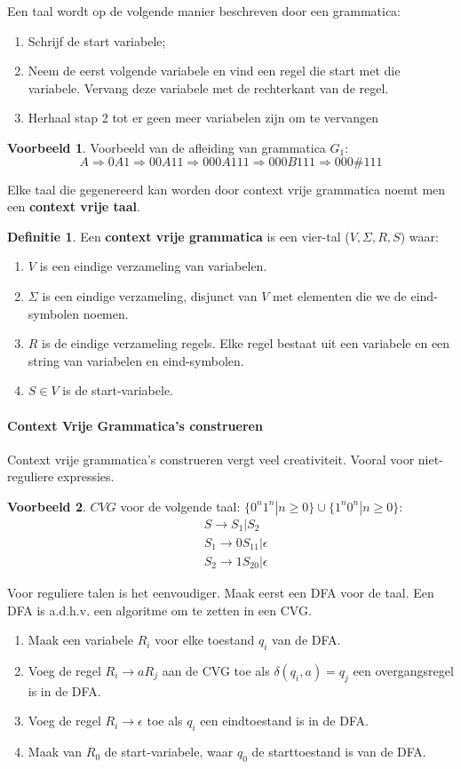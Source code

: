 \documentclass[12pt,a4paper]{article}
\theoremstyle{definition}
\newtheorem{defi}{Definitie}[section]
\newtheorem{vb}{Voorbeeld}[section]
\begin{document}
Een taal wordt op de volgende manier beschreven door een grammatica:
\begin{enumerate}
\item Schrijf de start variabele;
\item Neem de eerst volgende variabele en vind een regel die start met die variabele. Vervang deze variabele met de rechterkant van de regel.
\item Herhaal stap 2 tot er geen meer variabelen zijn om te vervangen
\end{enumerate}
\begin{vb}
Voorbeeld van de afleiding van grammatica $G_1$:
$$A\Rightarrow 0A1 \Rightarrow 00A11 \Rightarrow 000A111 \Rightarrow 000B111 \Rightarrow 000\#111$$
\end{vb}
Elke taal die gegenereerd kan worden door context vrije grammatica noemt men een \textbf{context vrije taal}.
\begin{defi}
Een \textbf{context vrije grammatica} is een vier-tal ($V,\Sigma,R,S$) waar:
\begin{enumerate}
\item $V$ is een eindige verzameling van variabelen.
\item $\Sigma$ is een eindige verzameling, disjunct van $V$ met elementen die we de eind-symbolen noemen.
\item $R$ is de eindige verzameling regels. Elke regel bestaat uit een variabele en een string van variabelen en eind-symbolen.
\item $S\in V$ is de start-variabele.

\end{enumerate}
\end{defi}

\paragraph{Context Vrije Grammatica's construeren}
Context vrije grammatica's construeren vergt veel creativiteit. Vooral voor niet-reguliere expressies.
\begin{vb}
$CVG$ voor de volgende taal: $\{0^n1^n|n\geq0\} \cup \{1^n0^n|n\geq 0\}$:\\
\begin{align*}
&S \rightarrow S_1|S_2\\
&S_1 \rightarrow 0S_11 | \epsilon\\
&S_2 \rightarrow 1S_20 | \epsilon
\end{align*}
\end{vb}
Voor reguliere talen is het eenvoudiger. Maak eerst een DFA voor de taal. Een DFA is a.d.h.v. een algoritme om te zetten in een CVG.
\begin{enumerate}
\item Maak een variabele $R_i$ voor elke toestand $q_i$ van de DFA.
\item Voeg de regel $R_i \rightarrow aR_j$ aan de CVG toe als $\delta (q_i,a) = q_j$ een overgangsregel is in de DFA.
\item Voeg de regel $R_i \rightarrow \epsilon$ toe als $q_i$ een eindtoestand is in de DFA.
\item Maak van $R_0$ de start-variabele, waar $q_0$ de starttoestand is van de DFA.
\end{enumerate}
\end{document}
